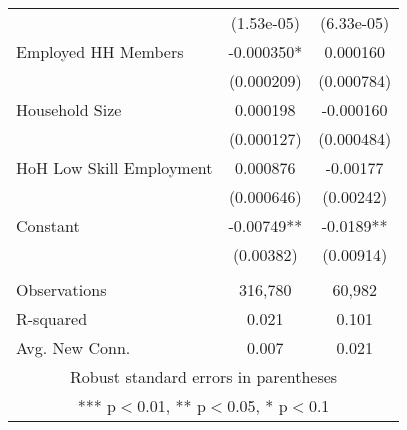 \begin{tabular}{lcc}
 & (1.53e-05) & (6.33e-05) \\
Employed HH Members & -0.000350* & 0.000160 \\
 & (0.000209) & (0.000784) \\
Household Size & 0.000198 & -0.000160 \\
 & (0.000127) & (0.000484) \\
HoH Low Skill Employment & 0.000876 & -0.00177 \\
 & (0.000646) & (0.00242) \\
Constant & -0.00749** & -0.0189** \\
 & (0.00382) & (0.00914) \\
 &  &  \\
Observations & 316,780 & 60,982 \\
R-squared & 0.021 & 0.101 \\
 Avg. New Conn. & 0.007 & 0.021 \\ \hline
\multicolumn{3}{c}{ Robust standard errors in parentheses} \\
\multicolumn{3}{c}{ *** p$<$0.01, ** p$<$0.05, * p$<$0.1} \\
\end{tabular}
